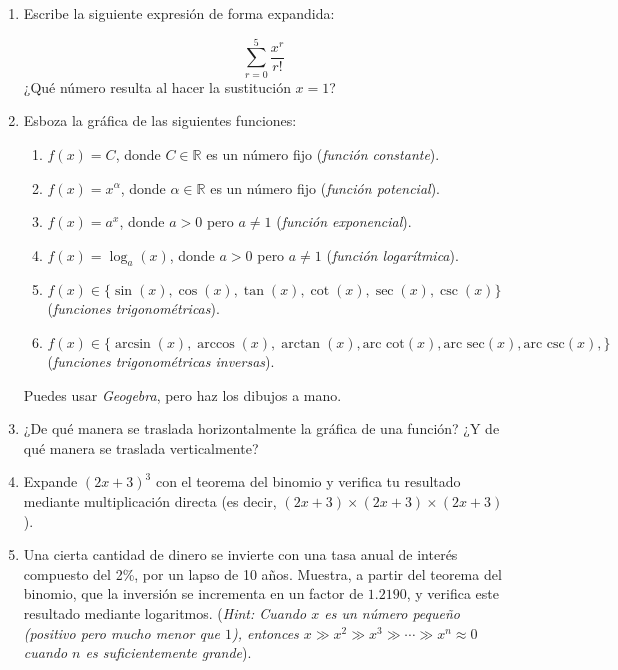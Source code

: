 \documentclass[10pt,a4paper]{article}
\begin{document}
	\begin{enumerate}

		\item Escribe la siguiente expresión de forma expandida:
			
			\[ \sum_{r=0}^5 \frac{x^r}{r!} \]
¿Qué número resulta al hacer la sustitución $x=1$?

		\item Esboza la gráfica de las siguientes funciones:
		
				\begin{enumerate}
					\item $f(x)=C$, donde $C\in\mathbb{R}$ es un número fijo (\textit{función constante}).
					\item $f(x)=x^{\alpha}$, donde $\alpha\in\mathbb{R}$ es un número fijo (\textit{función potencial}).
					\item $f(x)=a^x$, donde $a>0$ pero $a\neq 1$ (\textit{función exponencial}).
					\item $f(x)=\log_{a}(x)$, donde $a>0$ pero $a\neq 1$ (\textit{función logarítmica}).
					\item $f(x)\in\{\sin(x),\cos(x),\tan(x),\cot(x),\sec(x),\csc(x)\}$ (\textit{funciones trigonométricas}).
					\item $f(x)\in\{\arcsin(x),\arccos(x),\arctan(x),\textrm{arc cot}(x),\textrm{arc sec}(x),\textrm{arc csc}(x),\}$ (\textit{funciones trigonométricas inversas}).
				\end{enumerate}
Puedes usar \textit{Geogebra}, pero haz los dibujos a mano.
				
		\item ¿De qué manera se traslada horizontalmente la gráfica de una función? ¿Y de qué manera se traslada verticalmente?

		\item Expande $\left(2x+3\right)^3$ con el teorema del binomio y verifica tu resultado mediante multiplicación directa (es decir, $(2x+3)\times(2x+3)\times(2x+3)$).
		
		\item Una cierta cantidad de dinero se invierte con una tasa anual de interés compuesto del 2\%, por un lapso de 10 años. Muestra, a partir del teorema del binomio, que la inversión se incrementa en un factor de $1.2190$, y verifica este resultado mediante logaritmos. (\textit{Hint: Cuando $x$ es un número pequeño (positivo pero mucho menor que $1$), entonces $x\gg x^2\gg x^3 \gg\cdots\gg x^n\approx 0$ cuando $n$ es suficientemente grande}).
		

\end{enumerate}
\end{document}
